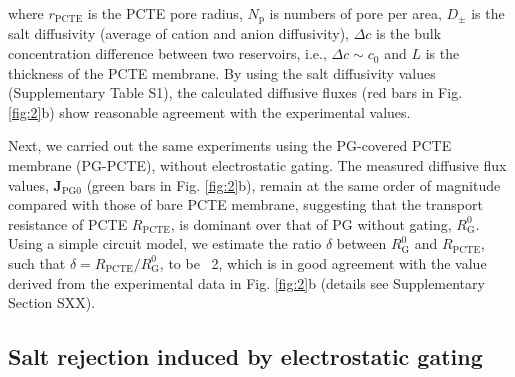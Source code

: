 \documentclass[journal=langd5,email=true, hyperref=true, keywords=false]{achemso}
\newcommand{\Fig}{Fig.}
\begin{document}
where $r_{\mathrm{PCTE}}$ is the PCTE pore radius, $N_{\mathrm{p}}$ is
numbers of pore per area, $D_{\mathrm{\pm}}$ is the salt diffusivity
(average of cation and anion diffusivity), $\Delta c$ is the bulk
concentration difference between two reservoirs, i.e.,
$\Delta c \sim c_{0}$ and $L$ is the thickness of the PCTE membrane.
By using the salt diffusivity values (Supplementary Table S1), the
calculated diffusive fluxes (red bars in \Fig{} \ref{fig:2}b) show
reasonable agreement with the experimental values.

Next, we carried out the same experiments using the PG-covered PCTE
membrane (PG-PCTE), without electrostatic gating. The measured
diffusive flux values, $\boldsymbol{J}_{\mathrm{PG0}}$ (green bars in
\Fig{} \ref{fig:2}b), remain at the same order of magnitude compared
with those of bare PCTE membrane, suggesting that the transport resistance
of PCTE $R_{\mathrm{PCTE}}$, is dominant over that of PG without gating,
$R_{\mathrm{G}}^{0}$. Using a simple circuit model, we estimate the
ratio $\delta$ between $R_{\mathrm{G}}^{0}$ and $R_{\mathrm{PCTE}}$,
such that $\delta = R_{\mathrm{PCTE}}/R_{\mathrm{G}}^{0}$, to be ~2,
which is in good agreement with the value derived from the
experimental data in \Fig{} \ref{fig:2}b (details see Supplementary Section SXX).



\subsection{Salt rejection induced by electrostatic gating}
\label{sec:res-2}
\end{document}
